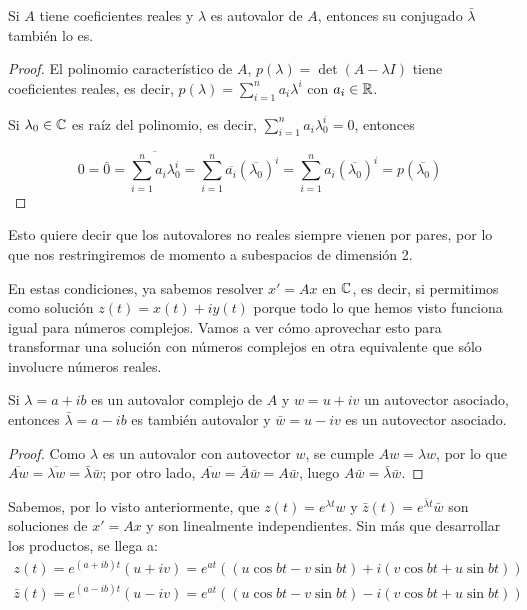 \documentclass[../ecuaciones_diferenciales.tex]{subfiles}
\begin{document}
\begin{proposition}
	Si \(A\) tiene coeficientes reales y \(\lambda\) es autovalor de \(A\),
	entonces su conjugado \(\bar{\lambda}\) también lo es.
	\begin{proof}
		El polinomio característico de \(A\), \(p(\lambda) = \det(A-\lambda I)\)
		tiene coeficientes reales, es decir, \(p(\lambda) = \sum_{i=1}^n
		a_i\lambda^i\) con \(a_i \in \mathbb{R}\).

		Si \(\lambda_0 \in \mathbb{C}\) es raíz del polinomio, es decir, \(\sum_{i=1}^n
		a_i\lambda_0^i = 0\), entonces

		\[0 = \bar{0} = \overline{\sum_{i=1}^n a_i\lambda_0^i} = \sum_{i=1}^n
			\overline{a_i}(\overline{\lambda_0})^i = \sum_{i=1}^n
			a_i(\overline{\lambda_0})^i = p(\overline{\lambda_0})\]
	\end{proof}
\end{proposition}

\begin{remark}
	Esto quiere decir que los autovalores no reales siempre vienen por pares,
	por lo que nos restringiremos de momento a subespacios de dimensión 2.
\end{remark}

\begin{remark}
	En estas condiciones, ya sabemos resolver \(x' = Ax\) en \(\mathbb{C}\), es
	decir, si permitimos como solución \(z(t) = x(t) + iy(t)\) porque todo lo
	que hemos visto funciona igual para números complejos. Vamos a ver cómo
	aprovechar esto para transformar una solución con números complejos en otra
	equivalente que sólo involucre números reales.
\end{remark}

\begin{proposition}
	Si \(\lambda = a + ib\) es un autovalor complejo de \(A\) y \(w = u + iv\)
	un autovector asociado, entonces \(\bar{\lambda} = a - ib\) es también
	autovalor y \(\bar{w} = u - iv\) es un autovector asociado.
	\begin{proof}
		Como \(\lambda\) es un autovalor con autovector \(w\), se cumple
		\(Aw = \lambda w\), por lo que
		\(\overline{Aw} = \overline{\lambda w} = \bar{\lambda} \bar{w}\); por otro
		lado, \(\overline{Aw} = \bar{A} \bar{w} = A \bar{w}\), luego \(A \bar{w} =
		\bar{\lambda} \bar{w}\).
	\end{proof}
\end{proposition}

Sabemos, por lo visto anteriormente, que \(z(t) = e^{\lambda t} w\) y
\(\bar{z}(t) = e^{\bar{\lambda} t} \bar{w}\) son soluciones de \(x' = Ax\) y
son linealmente independientes. Sin más que desarrollar los productos, se
llega a:
\begin{gather*}
	z(t) = e^{(a+ib)t} (u+iv) = e^{at}\left( (u\cos bt - v\sin bt) + i(v\cos bt + u\sin bt) \right) \\
	\bar{z}(t) = e^{(a-ib)t} (u-iv) = e^{at}\left( (u\cos bt - v\sin bt) - i(v\cos bt + u\sin bt) \right)
\end{gather*}
\end{document}
